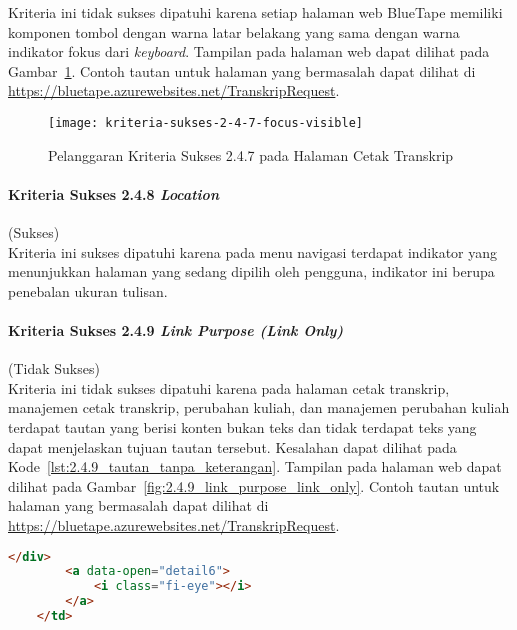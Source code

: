 Kriteria ini tidak sukses dipatuhi karena setiap halaman web BlueTape memiliki komponen tombol dengan warna latar belakang yang sama dengan warna indikator fokus dari \textit{keyboard}. Tampilan pada halaman web dapat dilihat pada \mbox{Gambar \ref{fig:2.4.7_focus_visible}}. Contoh tautan untuk halaman yang bermasalah dapat dilihat di \url{https://bluetape.azurewebsites.net/TranskripRequest}. 

\begin{figure}[H]
    \centering  
    \texttt{[image: kriteria-sukses-2-4-7-focus-visible]}  
    \caption[Pelanggaran Kriteria Sukses 2.4.7 pada Halaman Cetak Transkrip]{Pelanggaran Kriteria Sukses 2.4.7 pada Halaman Cetak Transkrip}
    \label{fig:2.4.7_focus_visible}  
\end{figure}

\paragraph{Kriteria Sukses 2.4.8 \textit{Location}}
\label{par:kepatuhan_bluetape_kriteria_sukses_2.4.8}
(Sukses)\\

Kriteria ini sukses dipatuhi karena pada menu navigasi terdapat indikator yang menunjukkan halaman yang sedang dipilih oleh pengguna, indikator ini berupa penebalan ukuran tulisan.

\paragraph{Kriteria Sukses 2.4.9 \textit{Link Purpose (Link Only)}}
\label{par:kepatuhan_bluetape_kriteria_sukses_2.4.9}
(Tidak Sukses)\\

Kriteria ini tidak sukses dipatuhi karena pada halaman cetak transkrip, manajemen cetak transkrip, perubahan kuliah, dan manajemen perubahan kuliah terdapat tautan yang berisi konten bukan teks dan tidak terdapat teks yang dapat menjelaskan tujuan tautan tersebut. Kesalahan dapat dilihat pada \mbox{Kode \ref{lst:2.4.9_tautan_tanpa_keterangan}}. Tampilan pada halaman web dapat dilihat pada \mbox{Gambar \ref{fig:2.4.9_link_purpose_link_only}}. Contoh tautan untuk halaman yang bermasalah dapat dilihat di \url{https://bluetape.azurewebsites.net/TranskripRequest}.

\begin{lstlisting}[frame=single, label={lst:2.4.9_tautan_tanpa_keterangan}, language=HTML, caption=Pelanggaran Kriteria Sukses 2.4.9 pada Halaman Cetak Transkrip]
        </div>
        <a data-open="detail6">
            <i class="fi-eye"></i>
        </a>
    </td>
\end{lstlisting}

